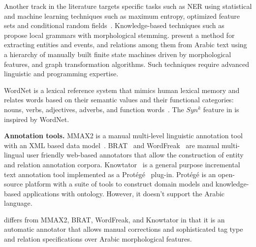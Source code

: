Another track in the literature targets specific tasks such as NER using 
statistical and machine learning techniques such as maximum entropy, 
optimized feature sets and conditional random fields~\cite{benajiba2007anersys,benajiba2008arabic,ekbal2010named,abdelrahman2010integrated}.
Knowledge-based techniques such 
as~\cite{zaghouani2010adapting,traboulsi2009arabic} propose local grammars with morphological stemming.%
\cite{ZaMaHaCicling2012Entity} present a method for extracting entities and events, and relations among them from Arabic text using a hierarchy of manually built 
finite state machines driven by morphological features, 
and graph transformation algorithms. 
Such techniques require advanced linguistic and programming expertise. 

WordNet is a lexical reference system that mimics human lexical memory 
and relates words based on their semantic values and their functional 
categories: nouns, verbs, adjectives, adverbs, and function words~\cite{intro}.
The $Syn^k$ feature in \framework is inspired by WordNet.

{\bf Annotation tools.}
MMAX2 is a manual multi-level linguistic annotation tool with an XML 
based data model~\cite{mmax2}.
BRAT~\cite{brat} and WordFreak~\cite{wordfreak} are manual 
multi-lingual user friendly web-based annotators that allow the construction 
of entity and relation annotation corpora.
Knowtator~\cite{ogren2006knowtator} is a general purpose incremental text annotation tool 
implemented as a Prot\'eg\'e~\cite{gennari2003evolution} plug-in. 
Prot\'eg\'e is an open-source platform with a suite of tools to construct domain models and knowledge-based applications with ontology. 
However, it doesn't support the Arabic language.

\framework differs from MMAX2, BRAT, WordFreak, and Knowtator in that it is 
an automatic annotator that allows manual corrections 
and sophisticated tag type and relation specifications over
Arabic morphological features.

